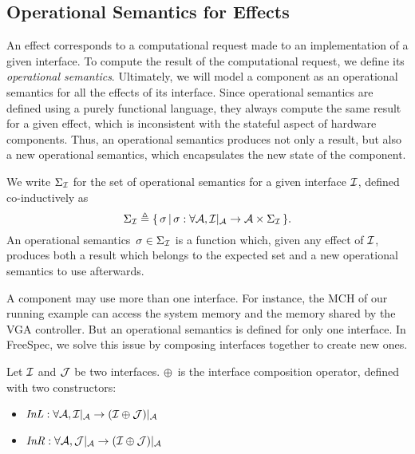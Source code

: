 \subsection{Operational Semantics for Effects}

An effect corresponds to a computational request made to an implementation of a
given interface.
%
To compute the result of the computational request, we define its
\emph{operational semantics}.
%
Ultimately, we will model a component as an operational semantics for all the
effects of its interface.
%
Since operational semantics are defined using a purely functional language, they
always compute the same result for a given effect, which is inconsistent with
the stateful aspect of hardware components.
%
Thus, an operational semantics produces not only a result, but also a new
operational semantics, which encapsulates the new state of the component.

\begin{definition}
  We write $\Sigma_{\mathcal{I}}$ for the set of operational semantics for a given
  interface $\mathcal{I}$, defined co-inductively as
  \[
    \Sigma_{\mathcal{I}} \triangleq \{\,\sigma\,|\,\sigma : \forall \mathcal{A},
    \mathcal{I}|_{\mathcal{A}} \rightarrow \mathcal{A} \times \Sigma_{\mathcal{I}} \,\}.
  \]
  An operational semantics~$\sigma \in \Sigma_{\mathcal{I}}$ is a function which, given
  any effect of $\mathcal{I}$, produces both a result which belongs to the expected set
  and a new operational semantics to use afterwards.
\end{definition}

A component may use more than one interface.
%
For instance, the MCH of our running example can access the system memory and
the memory shared by the VGA controller.
%
But an operational semantics is defined for only one interface.
%
In FreeSpec, we solve this issue by composing interfaces together to create new
ones.

\begin{definition}
  Let $\mathcal{I}$ and $\mathcal{J}$ be two interfaces. $\oplus$~is the interface composition
  operator, defined with two constructors:
  \begin{itemize}
  \item
    $\mathit{InL} : \forall \mathcal{A}, \mathcal{I}|_{\mathcal{A}} \rightarrow
    (\mathcal{I} \oplus \mathcal{J})|_{\mathcal{A}}$
  \item
    $\mathit{InR} : \forall \mathcal{A}, \mathcal{J}|_{\mathcal{A}} \rightarrow
    (\mathcal{I} \oplus \mathcal{J})|_{\mathcal{A}}$
  \end{itemize}
\end{definition}


